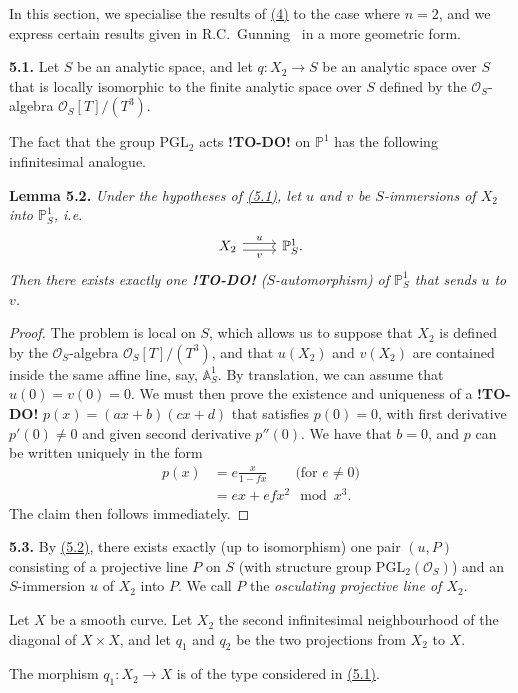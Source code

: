 \documentclass{report}
\newenvironment{itenv}[1]
  {\phantomsection\par\medskip\noindent\textbf{#1.}\itshape}
  {\par\medskip}
\newenvironment{rmenv}[1]
  {\phantomsection\par\medskip\noindent\textbf{#1.}\rmfamily}
  {\par\medskip}
\renewcommand{\cal}[1]{{\mathcal{#1}}}
\newcommand{\PP}{\mathbb{P}}
\renewcommand{\AA}{\mathbb{A}}
\newcommand{\todo}{\textbf{ !TO-DO! }}
\newcommand{\oldpage}[1]{\marginpar{\footnotesize$\Big\vert$ \textit{p.~#1}}}
\begin{document}
In this section, we specialise the results of \hyperref[I.4]{(4)} to the case where $n=2$, and we express certain results given in R.C.~Gunning~\cite{11} in a more geometric form.

\begin{rmenv}{5.1}
\label{I.5.1}
  Let $S$ be an analytic space, and let $q\colon X_2\to S$ be an analytic space over $S$ that is locally isomorphic to the finite analytic space over $S$ defined by the $\cal{O}_S$-algebra $\cal{O}_S[T]/(T^3)$.

  The fact that the group $\mathrm{PGL}_2$ acts \todo on $\PP^1$ has the following infinitesimal analogue.
\end{rmenv}

\begin{itenv}{Lemma 5.2}
\label{I.5.2}
  Under the hypotheses of \hyperref[I.5.1]{(5.1)}, let $u$ and $v$ be $S$-immersions of $X_2$ into $\PP_S^1$, i.e.
  \[
    \begin{tikzcd}
      X_2 \rar[shift left=1,"u"] \rar[shift right=1,swap,"v"]
      & \PP_S^1.
    \end{tikzcd}
  \]
  Then there exists exactly one \todo ($S$-automorphism) of $\PP_S^1$ that sends $u$ to $v$.
\end{itenv}

\begin{proof}
  The problem is local on $S$, which allows us to suppose that $X_2$ is defined by the $\cal{O}_S$-algebra $\cal{O}_S[T]/(T^3)$, and that $u(X_2)$ and $v(X_2)$ are contained inside the same affine line, say, $\AA_S^1$.
  By translation, we can assume that $u(0)=v(0)=0$.
  We must then prove the existence and uniqueness of a \todo $p(x)=(ax+b)(cx+d)$ that satisfies $p(0)=0$, with first derivative $p'(0)\neq0$ and given second derivative $p''(0)$.
  We have that $b=0$, and $p$ can be written uniquely in the form
\oldpage{30}
  \[
    \begin{aligned}
      p(x)
      &= e\frac{x}{1-fx} \qquad\mbox{(for $e\neq0$)}
    \\&= ex + efx^2 \mod x^3.
    \end{aligned}
  \]
  The claim then follows immediately.
\end{proof}

\begin{rmenv}{5.3}
\label{I.5.3}
  By \hyperref[I.5.2]{(5.2)}, there exists exactly (up to isomorphism) one pair $(u,P)$ consisting of a projective line $P$ on $S$ (with structure group $\mathrm{PGL}_2(\cal{O}_S)$) and an $S$-immersion $u$ of $X_2$ into $P$.
  We call $P$ the \emph{osculating projective line of $X_2$}.

  Let $X$ be a smooth curve.
  Let $X_2$ the second infinitesimal neighbourhood of the diagonal of $X\times X$, and let $q_1$ and $q_2$ be the two projections from $X_2$ to $X$.

  The morphism $q_1\colon X_2\to X$ is of the type considered in \hyperref[I.5.1]{(5.1)}.
\end{rmenv}
\end{document}
